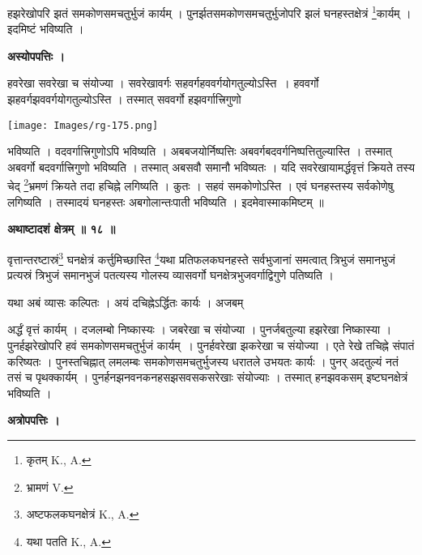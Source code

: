 \documentclass[11pt, openany]{book}
\begin{document}
\newpage

\noindent हझरेखोपरि झतं समकोणसमचतुर्भुजं कार्यम् । पुनर्झतसमकोणसमचतुर्भुजोपरि झलं घनहस्तक्षेत्रं \renewcommand{\thefootnote}{१}\footnote{ कृतम् {\en K., A.}}कार्यम् । इदमिष्टं भविष्यति ।\\
\vspace{2mm}

\begin{center}
\textbf{अस्योपपत्तिः ।}
\end{center}
\vspace{5mm}

हवरेखा सवरेखा च संयोज्या । सवरेखावर्गः सहवर्गहववर्गयोगतुल्योऽस्ति~। हववर्गो झहवर्गझववर्गयोगतुल्योऽस्ति । तस्मात् सववर्गो हझवर्गात्त्रिगुणो
\begin{center}
\texttt{[image: Images/rg-175.png]}  
\end{center}
भविष्यति । वदवर्गात्त्रिगुणोऽपि भविष्यति । अबबजयोर्निष्पत्तिः अबवर्गबदवर्गनिष्पत्तितुल्यास्ति । तस्मात् अबवर्गो बदवर्गात्त्रिगुणो भविष्यति । तस्मात् अबसवौ समानौ भविष्यतः । यदि सवरेखायामर्द्धवृत्तं क्रियते तस्य चेद् \renewcommand{\thefootnote}{२}\footnote{भ्रामणं {\en V.}}भ्रमणं क्रियते तदा हचिह्ने
लगिष्यति । कुतः । सहवं समकोणोऽस्ति । एवं घनहस्तस्य सर्वकोणेषु लगिष्यति । तस्मादयं घनहस्तः अबगोलान्तःपाती भविष्यति । इदमेवास्माकमिष्टम् ॥\\
\begin{center}
\textbf{\large अथाष्टादशं क्षेत्रम् ॥ १८ ॥ }
\end{center}
\vspace{5mm}

{\ab वृत्तान्तरष्टास्रं\renewcommand{\thefootnote}{३}\footnote{अष्टफलकघनक्षेत्रं {\en K., A.}} घनक्षेत्रं कर्त्तुमिच्छास्ति \renewcommand{\thefootnote}{४}\footnote{यथा पतति {\en K., A.}}यथा प्रतिफलकघनहस्ते सर्वभुजानां समत्वात् त्रिभुजं समानभुजं प्रत्यस्रं त्रिभुजं समानभुजं पतत्यस्य गोलस्य व्यासवर्गो घनक्षेत्रभुजवर्गाद्विगुणे पतिष्यति । }\\
\vspace{3mm}

यथा अबं व्यासः कल्पितः । अयं दचिह्नेऽर्द्धितः कार्यः । अजबम् 


\newpage
\noindent अर्द्धं वृत्तं कार्यम् । दजलम्बो निष्कास्यः । जबरेखा च संयोज्या । पुनर्जबतुल्या हझरेखा निष्कास्या । पुनर्हझरेखोपरि हवं समकोणसमचतुर्भुजं कार्यम्~। पुनर्हवरेखा झकरेखा च संयोज्या । एते रेखे तचिह्ने संपातं करिष्यतः । पुनस्तचिह्नात् लमलम्बः समकोणसमचतुर्भुजस्य धरातले उभयतः कार्यः । पुनर् अदतुल्यं नतं तसं च पृथक्कार्यम् । पुनर्हनझनवनकनहसझसवसकसरेखाः संयोज्याः । तस्मात् हनझवकसम् इष्टघनक्षेत्रं भविष्यति ।\\
\begin{center}
\textbf{अत्रोपपत्तिः ।}
\end{center}
\vspace{5mm}
\end{document}
